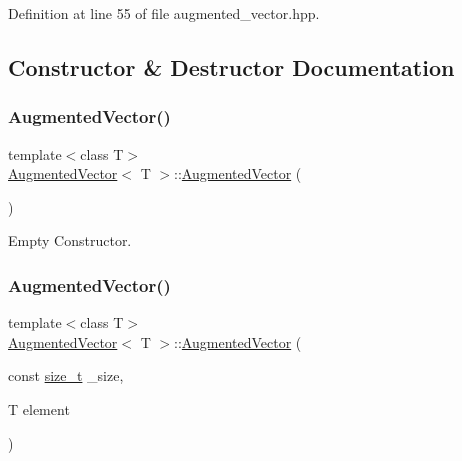 Definition at line 55 of file augmented\+\_\+vector.\+hpp.



\subsection{Constructor \& Destructor Documentation}
\mbox{\label{classAugmentedVector_ad566bd36f4f186f13b1676ede908b445}} 
\subsubsection{\texorpdfstring{Augmented\+Vector()}{AugmentedVector()}\hspace{0.1cm}{\footnotesize\ttfamily [1/4]}}
{\footnotesize\ttfamily template$<$class T$>$ \\
\hyperlink{classAugmentedVector}{Augmented\+Vector}$<$ T $>$\+::\hyperlink{classAugmentedVector}{Augmented\+Vector} (\begin{DoxyParamCaption}{ }\end{DoxyParamCaption})\hspace{0.3cm}{\ttfamily [default]}}



Empty Constructor. 

\mbox{\label{classAugmentedVector_a308f46c5a85c826800c55b5c2ab375ae}} 
\subsubsection{\texorpdfstring{Augmented\+Vector()}{AugmentedVector()}\hspace{0.1cm}{\footnotesize\ttfamily [2/4]}}
{\footnotesize\ttfamily template$<$class T$>$ \\
\hyperlink{classAugmentedVector}{Augmented\+Vector}$<$ T $>$\+::\hyperlink{classAugmentedVector}{Augmented\+Vector} (\begin{DoxyParamCaption}\item[{const \hyperlink{tutorial__fpt__2017_2intro_2sixth_2test_8c_a7c94ea6f8948649f8d181ae55911eeaf}{size\+\_\+t}}]{\+\_\+size,  }\item[{T}]{element }\end{DoxyParamCaption})\hspace{0.3cm}{\ttfamily [inline]}}



